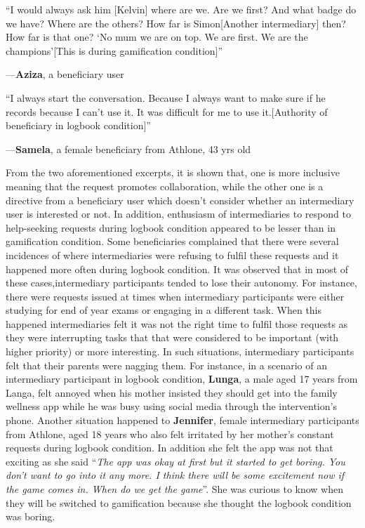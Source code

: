 \documentclass{sig-alternate}
\newenvironment{myquote}
               {\list{}{\rightmargin   \leftmargin
                        \parsep        0in }%
                \item\relax}
               {\endlist}
\newcommand{\userquote}[2]{\begin{samepage}\begin{myquote} 
     \em{\small{#2\begin{flushright}---#1\end{flushright}}}
   \end{myquote}\end{samepage}}
\begin{document}
\userquote{\textbf{Aziza}, a beneficiary user}{``I would always ask him [Kelvin] where are we. Are we first? And what badge do we have? Where are the others? How far is Simon[Another intermediary] then? How far is that one? `No mum we are on top. We are first. We are the champions'[This is during gamification condition]''} 

\userquote{\textbf{Samela}, a female beneficiary from Athlone, 43 yrs old} {``I always start the conversation. Because I always want to make sure if he records because I can't use it. It was difficult for me to use it.[Authority of beneficiary in logbook condition]''}

From the two aforementioned excerpts, it is shown that, one is more inclusive meaning that the request promotes collaboration, while the other one is a directive from a beneficiary user which doesn't consider whether an intermediary user is interested or not. In addition, enthusiasm of intermediaries to respond to help-seeking requests during logbook condition appeared to be lesser than in gamification condition. Some beneficiaries complained that there were several incidences of where intermediaries were refusing to fulfil these requests and it happened more often during logbook condition. It was observed that in most of these cases,intermediary participants tended to lose their autonomy. For instance, there were requests issued at times when intermediary participants were either studying for end of year exams or engaging in a different task. When this happened intermediaries felt it was not the right time to fulfil those requests as they were interrupting tasks that that were considered to be important (with higher priority) or more interesting. In such situations, intermediary participants felt that their parents were nagging them. For instance, in a scenario of an intermediary participant in logbook condition, \textbf{Lunga}, a male aged 17 years from Langa, felt annoyed when his mother insisted they should get into the family wellness app while he was busy using social media through the intervention's phone. Another situation happened to \textbf{Jennifer}, female intermediary participants from Athlone, aged 18 years who also felt irritated by her mother's constant requests during logbook condition. In addition she felt the app was not that exciting as she said ``\emph{The app was okay at first but it started to get boring. You don't want to go into it any more. I think there will be some excitement now if the game comes in. When do we get the game}''. She was curious to know when they will be switched to gamification because she thought the logbook condition was boring.
\end{document}
